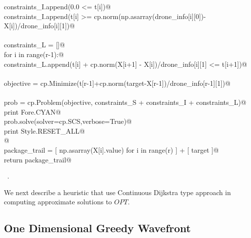\documentclass[12pt, english, oneside]{report}
\begin{document}
\begin{flushleft}
\begin{list}{}{}
\mbox{}\verb@      constraints_I.append(0.0 <= t[i])@\\
\mbox{}\verb@      constraints_I.append(t[i] >= cp.norm(np.asarray(drone_info[i][0])-X[i])/drone_info[i][1])@\\
\mbox{}\verb@@\\
\mbox{}\verb@    constraints_L = []@\\
\mbox{}\verb@    for i in range(r-1):@\\
\mbox{}\verb@      constraints_L.append(t[i] + cp.norm(X[i+1] - X[i])/drone_info[i][1] <= t[i+1])@\\
\mbox{}\verb@@\\
\mbox{}\verb@    objective = cp.Minimize(t[r-1]+cp.norm(target-X[r-1])/drone_info[r-1][1])@\\
\mbox{}\verb@@\\
\mbox{}\verb@    prob = cp.Problem(objective, constraints_S + constraints_I + constraints_L)@\\
\mbox{}\verb@    print Fore.CYAN@\\
\mbox{}\verb@    prob.solve(solver=cp.SCS,verbose=True)@\\
\mbox{}\verb@    print Style.RESET_ALL@\\
\mbox{}\verb@    @\\
\mbox{}\verb@    package_trail = [ np.asarray(X[i].value) for i in range(r) ] + [ target ]@\\
\mbox{}\verb@    return package_trail@\\
\mbox{}\verb@@{\NWsep}
\end{list}
\vspace{-1.5ex}
\footnotesize
\begin{list}{}{\setlength{\itemsep}{-\parsep}\setlength{\itemindent}{-\leftmargin}}
\item \NWtxtMacroRefIn\ .

\item{}
\end{list}
\vspace{4ex}
\end{flushleft}


We next describe a heuristic that use Continuous Dijkstra \cite{mitchell2000geometric} 
type approach in computing approximate solutions to $OPT$.

\subsection{One Dimensional Greedy Wavefront}
\label{ssec:odw}
\end{document}
